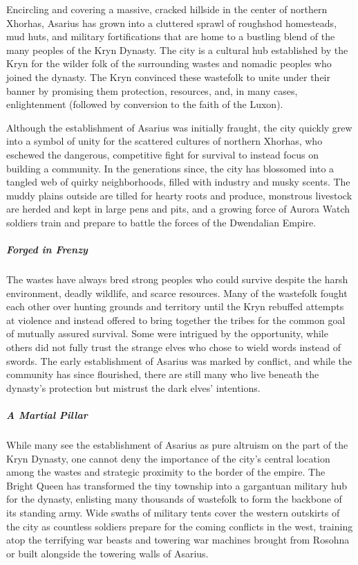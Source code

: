 \documentclass[10pt,a4paper,twoside,bg=print,twocolumn,openany,nodeprecatedcode]{dndbook}
\begin{document}
Encircling and covering a massive, cracked hillside in the center of northern Xhorhas, Asarius has grown into a cluttered sprawl of roughshod homesteads, mud huts, and military fortifications that are home to a bustling blend of the many peoples of the Kryn Dynasty. The city is a cultural hub established by the Kryn for the wilder folk of the surrounding wastes and nomadic peoples who joined the dynasty. The Kryn convinced these wastefolk to unite under their banner by promising them protection, resources, and, in many cases, enlightenment (followed by conversion to the faith of the Luxon).

Although the establishment of Asarius was initially fraught, the city quickly grew into a symbol of unity for the scattered cultures of northern Xhorhas, who eschewed the dangerous, competitive fight for survival to instead focus on building a community. In the generations since, the city has blossomed into a tangled web of quirky neighborhoods, filled with industry and musky scents. The muddy plains outside are tilled for hearty roots and produce, monstrous livestock are herded and kept in large pens and pits, and a growing force of Aurora Watch soldiers train and prepare to battle the forces of the Dwendalian Empire.

\subparagraph{Forged in Frenzy}
The wastes have always bred strong peoples who could survive despite the harsh environment, deadly wildlife, and scarce resources. Many of the wastefolk fought each other over hunting grounds and territory until the Kryn rebuffed attempts at violence and instead offered to bring together the tribes for the common goal of mutually assured survival. Some were intrigued by the opportunity, while others did not fully trust the strange elves who chose to wield words instead of swords. The early establishment of Asarius was marked by conflict, and while the community has since flourished, there are still many who live beneath the dynasty's protection but mistrust the dark elves' intentions.

\subparagraph{A Martial Pillar}
While many see the establishment of Asarius as pure altruism on the part of the Kryn Dynasty, one cannot deny the importance of the city's central location among the wastes and strategic proximity to the border of the empire. The Bright Queen has transformed the tiny township into a gargantuan military hub for the dynasty, enlisting many thousands of wastefolk to form the backbone of its standing army. Wide swaths of military tents cover the western outskirts of the city as countless soldiers prepare for the coming conflicts in the west, training atop the terrifying war beasts and towering war machines brought from Rosohna or built alongside the towering walls of Asarius.
\end{document}
